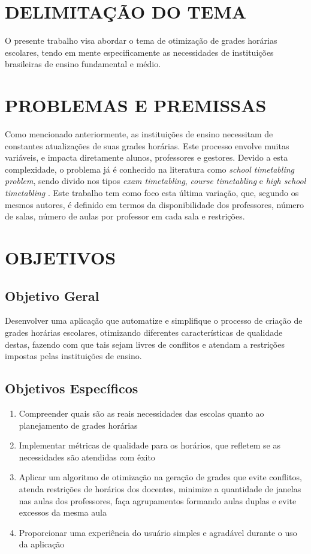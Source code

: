 \section{DELIMITAÇÃO DO TEMA}
\label{sec:antesleiame}

O presente trabalho visa abordar o tema de otimização de grades horárias escolares, tendo em mente especificamente as necessidades de instituições brasileiras de ensino fundamental e médio. 

\section{PROBLEMAS E PREMISSAS}
\label{sec:organizacaoTrabalho}

Como mencionado anteriormente, as instituições de ensino necessitam de constantes atualizações de suas grades horárias. Este processo envolve muitas variáveis, e impacta diretamente alunos, professores e gestores. Devido a esta complexidade, o problema já é conhecido na literatura como \textit{school timetabling problem}, sendo divido nos tipos \textit{exam timetabling}, \textit{course timetabling} e \textit{high school timetabling} \cite{TAN2021113943}. Este trabalho tem como foco esta última variação, que, segundo os mesmos autores, é definido em termos da disponibilidade dos professores, número de salas, número de aulas por professor em cada sala e restrições.

\section{OBJETIVOS}
\subsection{Objetivo Geral}

Desenvolver uma aplicação que automatize e simplifique o processo de criação de grades horárias escolares, otimizando diferentes características de qualidade destas, fazendo com que tais sejam livres de conflitos e atendam a restrições impostas pelas instituições de ensino.

\subsection{Objetivos Específicos}

\begin{enumerate}
	\item Compreender quais são as reais necessidades das escolas quanto ao planejamento de grades horárias
	\item Implementar métricas de qualidade para os horários, que refletem se as necessidades são atendidas com êxito
	\item Aplicar um algoritmo de otimização na geração de grades que evite conflitos, atenda restrições de horários dos docentes, minimize a quantidade de janelas nas aulas dos professores, faça agrupamentos formando aulas duplas e evite excessos da mesma aula
	\item Proporcionar uma experiência do usuário simples e agradável durante o uso da aplicação
\end{enumerate}

